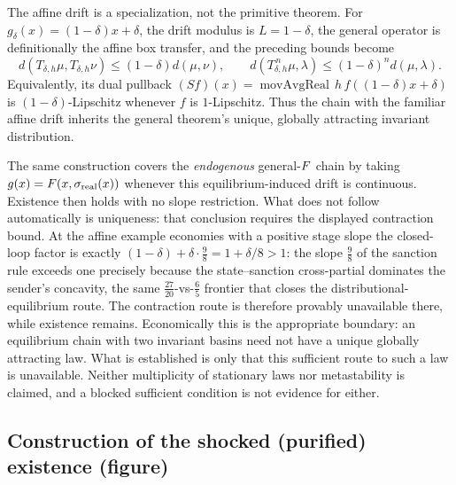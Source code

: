 The affine drift is a specialization, not the primitive theorem.
For $g_\delta(x)=(1-\delta)x+\delta$, the drift modulus is
$L=1-\delta$, the general operator is definitionally the affine box
transfer, and the preceding bounds become
\[
d(T_{\delta,h}\mu,T_{\delta,h}\nu)
\le(1-\delta)d(\mu,\nu),
\qquad
d(T_{\delta,h}^{\,n}\mu,\lambda)
\le(1-\delta)^n d(\mu,\lambda).
\]
Equivalently, its dual pullback
$(Sf)(x)=\operatorname{movAvgReal}\,h\,f((1-\delta)x+\delta)$ is
$(1-\delta)$-Lipschitz whenever $f$ is $1$-Lipschitz.  Thus the chain with the familiar
affine drift inherits the general theorem's unique, globally
attracting invariant distribution.

The same construction covers the \emph{endogenous} general-$F$ chain
by taking $g(x)=F(x,\sigma_{\mathrm{real}}(x))$ whenever this
equilibrium-induced drift is continuous.  Existence then holds with no
slope restriction.  What does not follow automatically is uniqueness:
that conclusion requires the displayed contraction bound.  At the
affine example economies with a positive stage slope the closed-loop factor is exactly
$(1-\delta)+\delta\cdot\tfrac98=1+\delta/8>1$: the slope $\tfrac98$ of the
sanction rule exceeds one precisely because the state--sanction cross-partial
dominates the sender's concavity, the same
$\tfrac{27}{20}$-vs-$\tfrac65$ frontier that closes the
distributional-equilibrium route.  The contraction route is therefore
provably unavailable there, while existence remains.  Economically this
is the appropriate boundary: an equilibrium chain with two invariant
basins need not have a unique globally attracting law. What is
established is only that this sufficient route to such a law is
unavailable. Neither multiplicity of stationary laws nor metastability
is claimed, and a blocked sufficient condition is not evidence for
either.

\subsection{Construction of the shocked (purified) existence (figure)}

